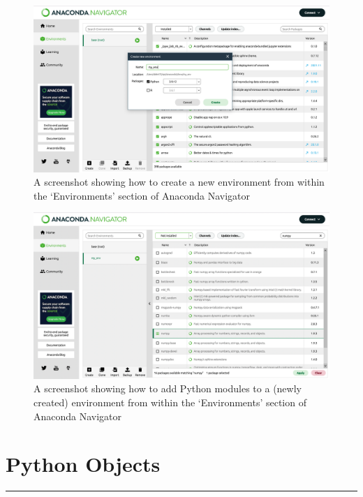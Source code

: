 \documentclass[a4paper,11pt]{book}
\begin{document}
\begin{figure}
	\includegraphics[width=1\textwidth]{anaconda_nav_env_0.png}
	\caption{A screenshot showing how to create a new environment from within the `Environments' section of Anaconda Navigator}
	\label{fig:anaconda_venv_0}
\end{figure}

\begin{figure}
	\includegraphics[width=1\textwidth]{anaconda_nav_env_1.png}
	\caption{A screenshot showing how to add Python modules to a (newly created) environment from within the `Environments' section of Anaconda Navigator}
	\label{fig:anaconda_venv_1}
\end{figure}
\clearpage

\theendnotes

\chapter{Python Objects}
\label{ch:objects}

\par\noindent\rule{\textwidth}{0.4pt}
\end{document}
